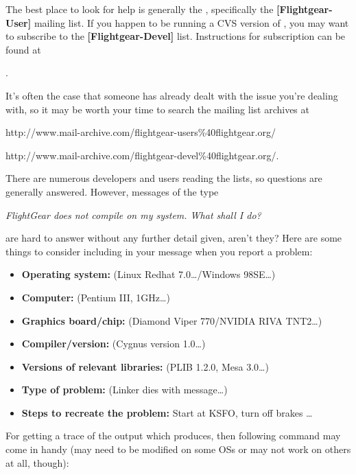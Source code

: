 The best place to look for help is generally the , specifically the  \textbf{[Flightgear-User]} mailing list. If you happen to be running a CVS version of \FlightGear{}, you may want to subscribe to the \textbf{[Flightgear-Devel]} list. Instructions for subscription can be
found at
 \medskip

.
 \medskip

\noindent
It's often the case that someone has already dealt with the issue you're dealing with, so it may be worth your time to search the mailing list archives at
 \medskip

http://www.mail-archive.com/flightgear-users\%40flightgear.org/

http://www.mail-archive.com/flightgear-devel\%40flightgear.org/.
 \medskip

\noindent
There are numerous developers and users reading the lists, so questions are generally answered. However, messages of the type

\textit{FlightGear does not compile on my system. What shall I do?}

 \noindent
are hard to answer without any further detail given, aren't they? Here are some things to consider including in your message when you report a problem:
 \medskip

\begin{itemize}
\item \textbf{Operating system:} (Linux Redhat 7.0\ldots/Windows 98SE\ldots)

\item \textbf{Computer:} (Pentium III, 1GHz\ldots)

\item \textbf{Graphics board/chip:} (Diamond Viper 770/NVIDIA RIVA TNT2\ldots)

\item \textbf{Compiler/version:} (Cygnus version 1.0\ldots)

\item \textbf{Versions of relevant libraries:} (PLIB 1.2.0, Mesa 3.0\ldots)

\item \textbf{Type of problem:} (Linker dies with message\ldots)

\item \textbf{Steps to recreate the problem:} Start at KSFO, turn off brakes \ldots

\end{itemize}

For getting a trace of the output which \FlightGear{} produces, then following command may come in handy (may need to be modified on some OSs or may not work on others at all, though):
\medskip

